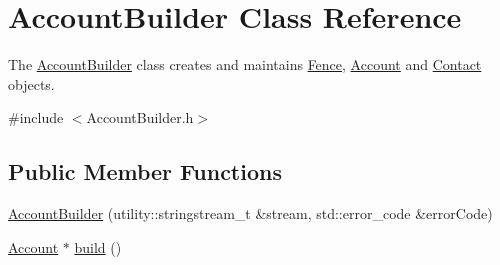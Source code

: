\hypertarget{class_account_builder}{}\section{Account\+Builder Class Reference}
\label{class_account_builder}


The \hyperlink{class_account_builder}{Account\+Builder} class creates and maintains \hyperlink{class_fence}{Fence}, \hyperlink{class_account}{Account} and \hyperlink{class_contact}{Contact} objects.  




{\ttfamily \#include $<$Account\+Builder.\+h$>$}

\subsection*{Public Member Functions}
\begin{DoxyCompactItemize}
\item 
\hyperlink{class_account_builder_ae19ca737d825f1ecc99e8406a19a0699}{Account\+Builder} (utility\+::stringstream\+\_\+t \&stream, std\+::error\+\_\+code \&error\+Code)
\item 
\hyperlink{class_account}{Account} $\ast$ \hyperlink{class_account_builder_af44cc9897467096f65d3bd768fd01300}{build} ()
\end{DoxyCompactItemize}
